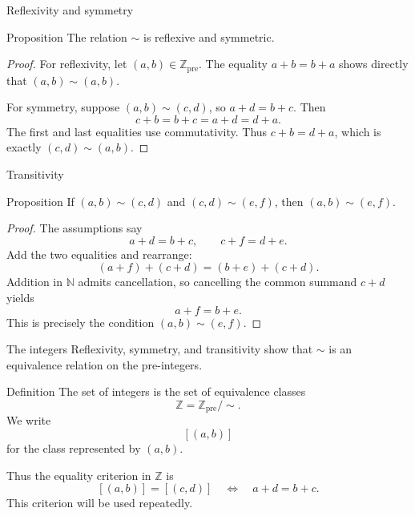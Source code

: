 \documentclass[aspectratio=169,11pt]{beamer}
\newcommand{\N}{\mathbb N}
\newcommand{\Z}{\mathbb Z}
\newcommand{\cl}[2]{\left[(#1,#2)\right]}
\begin{document}
\begin{frame}{Reflexivity and symmetry}
  \begin{block}{Proposition}
    The relation \(\sim\) is reflexive and symmetric.
  \end{block}

  \begin{proof}
    For reflexivity, let \((a,b)\in\Z_{\mathrm{pre}}\).  The equality \(a+b=b+a\)
    shows directly that \((a,b)\sim(a,b)\).

    For symmetry, suppose \((a,b)\sim(c,d)\), so \(a+d=b+c\).  Then
    \[
      c+b=b+c=a+d=d+a.
    \]
    The first and last equalities use commutativity.  Thus
    \(c+b=d+a\), which is exactly \((c,d)\sim(a,b)\).
  \end{proof}
\end{frame}

\begin{frame}{Transitivity}
  \small
  \begin{block}{Proposition}
    If \((a,b)\sim(c,d)\) and \((c,d)\sim(e,f)\), then
    \((a,b)\sim(e,f)\).
  \end{block}

  \begin{proof}
    The assumptions say
    \[
      a+d=b+c,
      \qquad
      c+f=d+e.
    \]
    Add the two equalities and rearrange:
    \[
      (a+f)+(c+d)=(b+e)+(c+d).
    \]
    Addition in \(\N\) admits cancellation, so cancelling the common summand
    \(c+d\) yields
    \[
      a+f=b+e.
    \]
    This is precisely the condition \((a,b)\sim(e,f)\).
  \end{proof}
\end{frame}

\begin{frame}{The integers}
  Reflexivity, symmetry, and transitivity show that \(\sim\) is an equivalence
  relation on the pre-integers.

  \begin{block}{Definition}
    The set of integers is the set of equivalence classes
    \[
      \boxed{\Z=\Z_{\mathrm{pre}}/{\sim}}.
    \]
    We write
    \[
      \cl{a}{b}
    \]
    for the class represented by \((a,b)\).
  \end{block}

  Thus the equality criterion in \(\Z\) is
  \[
    \boxed{\cl{a}{b}=\cl{c}{d}
      \quad\Longleftrightarrow\quad a+d=b+c.}
  \]
  This criterion will be used repeatedly.
\end{frame}
\end{document}
